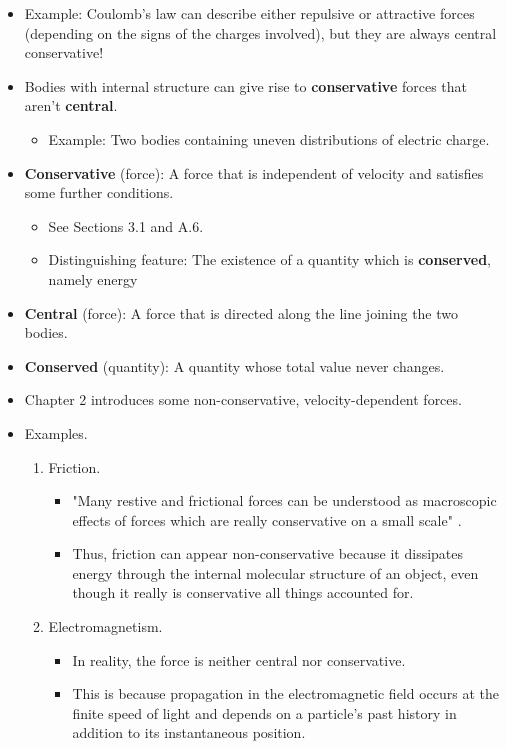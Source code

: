 \documentclass[../notes.tex]{subfiles}
\begin{document}
\begin{itemize}
    \item Example: Coulomb's law can describe either repulsive or attractive forces (depending on the signs of the charges involved), but they are always central conservative!
    \item Bodies with internal structure can give rise to \textbf{conservative} forces that aren't \textbf{central}.
    \begin{itemize}
        \item Example: Two bodies containing uneven distributions of electric charge.
    \end{itemize}
    \item \textbf{Conservative} (force): A force that is independent of velocity and satisfies some further conditions.
    \begin{itemize}
        \item See Sections 3.1 and A.6.
        \item Distinguishing feature: The existence of a quantity which is \textbf{conserved}, namely energy
    \end{itemize}
    \item \textbf{Central} (force): A force that is directed along the line joining the two bodies.
    \item \textbf{Conserved} (quantity): A quantity whose total value never changes.
    \item Chapter 2 introduces some non-conservative, velocity-dependent forces.
    \item Examples.
    \begin{enumerate}
        \item Friction.
        \begin{itemize}
            \item "Many restive and frictional forces can be understood as macroscopic effects of forces which are really conservative on a small scale" \parencite[9]{bib:KibbleBerkshire}.
            \item Thus, friction can appear non-conservative because it dissipates energy through the internal molecular structure of an object, even though it really is conservative all things accounted for.
        \end{itemize}
        \item Electromagnetism.
        \begin{itemize}
            \item In reality, the force is neither central nor conservative.
            \item This is because propagation in the electromagnetic field occurs at the finite speed of light and depends on a particle's past history in addition to its instantaneous position.

\end{itemize}
\end{enumerate}
\end{itemize}
\end{document}
